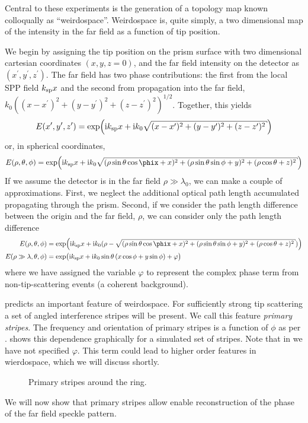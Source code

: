 Central to these experiments is the generation of a topology map known
colloqually as ``weirdospace''.  Weirdospace is, quite simply, a two
dimensional map of the intensity in the far field as a function of tip position.  

We begin by assigning the tip position on the
prism surface with two dimensional cartesian coordinates $(x,y,z=0)$, and
the far field intensity on the detector as $(x^\prime,y^\prime,z^\prime)$.
The far field has two phase contributions: the first from the local SPP field
$k_\mathrm{sp} x$ and the second from propagation into the far field,
$k_0\left((x-x^\prime)^2+ (y-y^\prime)^2+
(z-z^\prime)^2\right)^{1/2}$.  Together, this yields
\begin{equation}
E(x^\prime,y^\prime,z^\prime) = \exp\!\left( \mi\ksp x + %
\mi k_0\sqrt{ (x-x^\prime)^2+ (y-y^\prime)^2+ (z-z^\prime)^2 } \right)
\end{equation}
or, in spherical coordinates,
\begin{equation}
E(\rho,\theta,\phi) = \exp\!\left( \mi\ksp x + %
\mi k_0\sqrt{
(\rho\sin\theta\cos\phix+x)^2+(\rho\sin\theta\sin\phi+y)^2+(\rho\cos\theta+z)^2 } \right)
\end{equation}
If we assume the detector is in the far field $\rho\gg\lambda_0$, we can
make a couple of approximations.  First, we neglect the additional optical
path length accumulated propagating through the prism.  Second, if we
consider the path length difference between the origin and the far field,
$\rho$, we can consider only the path length difference
\begin{align}
E(\rho,\theta,\phi) &= \exp\!\left( \mi\ksp x + %
\mi k_0(\rho-\sqrt{ (\rho\sin\theta\cos\phix+x)^2+(\rho\sin\theta\sin\phi+y)^2+(\rho\cos\theta+z)^2
}) \right)\\
E(\rho\gg\lambda,\theta,\phi) &= \exp\!\big( \mi \ksp x
 + \mi k_0 \sin\theta \left(x\cos\phi+y\sin\phi\right)
 + \varphi\big)
	\label{eqn:primarystripes}
\end{align}
where we have assigned the variable $\varphi$ to represent the complex phase term
from non-tip-scattering events (a coherent background).  

 predicts an important feature of weirdospace.
For sufficiently strong tip scattering a set of angled interference stripes
will be present.  We call this feature \textit{primary stripes}.  The
frequency and orientation of primary stripes is a function of $\phi$ as per
.   shows this
dependence graphically for a simulated set of stripes.  Note that in
 we have not specified $\varphi$.  This term
could lead to higher order features in wierdospace, which we will discuss
shortly.
\begin{figure}
\centering
\caption{Primary stripes around the ring.}
\label{fig:primarystripes}
\end{figure}

We will now show that primary stripes allow enable reconstruction of the
phase of the far field speckle pattern.  
